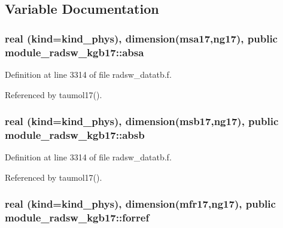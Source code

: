 \subsection{Variable Documentation}
\subsubsection[{\texorpdfstring{absa}{absa}}]{\setlength{\rightskip}{0pt plus 5cm}real (kind=kind\+\_\+phys), dimension({\bf msa17},ng17), public module\+\_\+radsw\+\_\+kgb17\+::absa}\hypertarget{namespacemodule__radsw__kgb17_a19083764c3dfe437282b032517baf3ed}{}\label{namespacemodule__radsw__kgb17_a19083764c3dfe437282b032517baf3ed}


Definition at line 3314 of file radsw\+\_\+datatb.\+f.



Referenced by taumol17().

\subsubsection[{\texorpdfstring{absb}{absb}}]{\setlength{\rightskip}{0pt plus 5cm}real (kind=kind\+\_\+phys), dimension({\bf msb17},ng17), public module\+\_\+radsw\+\_\+kgb17\+::absb}\hypertarget{namespacemodule__radsw__kgb17_aef407d13a88f5e1bfd20652ab3010e2f}{}\label{namespacemodule__radsw__kgb17_aef407d13a88f5e1bfd20652ab3010e2f}


Definition at line 3314 of file radsw\+\_\+datatb.\+f.



Referenced by taumol17().

\subsubsection[{\texorpdfstring{forref}{forref}}]{\setlength{\rightskip}{0pt plus 5cm}real (kind=kind\+\_\+phys), dimension({\bf mfr17},ng17), public module\+\_\+radsw\+\_\+kgb17\+::forref}\hypertarget{namespacemodule__radsw__kgb17_a5041a137ba35dca9a767ce854748dd49}{}\label{namespacemodule__radsw__kgb17_a5041a137ba35dca9a767ce854748dd49}


